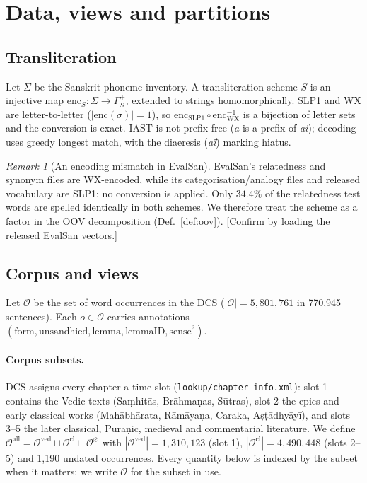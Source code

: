 \documentclass[11pt,a4paper]{article}
\theoremstyle{remark}\newtheorem{remark}{Remark}
\newcommand{\Occ}{\mathcal{O}}          %
\newcommand{\todo}[1]{\textcolor{red!70!black}{[#1]}}
\begin{document}
\section{Data, views and partitions}\label{sec:views}
\subsection{Transliteration}\label{sec:translit}
Let $\Sigma$ be the Sanskrit phoneme inventory. A transliteration scheme $S$ is
an injective map $\mathrm{enc}_S:\Sigma\to\Gamma_S^{+}$, extended to strings
homomorphically. SLP1 and WX are letter-to-letter
($|\mathrm{enc}(\sigma)|=1$), so $\mathrm{enc}_{\text{SLP1}}\circ
\mathrm{enc}_{\text{WX}}^{-1}$ is a bijection of letter sets and the
conversion is exact. IAST is not prefix-free (\emph{a} is a prefix of
\emph{ai}); decoding uses greedy longest match, with the diaeresis (\emph{aï})
marking hiatus.

\begin{remark}[An encoding mismatch in EvalSan]\label{rem:wx}
EvalSan's relatedness and synonym files are WX-encoded, while its
categorisation/analogy files and released vocabulary are SLP1; no
conversion is applied. Only $34.4\%$ of the relatedness test words are spelled
identically in both schemes. We therefore treat the scheme as a factor in the
OOV decomposition (Def.~\ref{def:oov}).
\todo{Confirm by loading the released EvalSan vectors.}
\end{remark}

\subsection{Corpus and views}
Let $\Occ$ be the set of word occurrences in the DCS ($|\Occ| = 5{,}801{,}761$
in 770,945 sentences). Each $o\in\Occ$ carries annotations
$(\text{form}, \text{unsandhied}, \text{lemma}, \text{lemmaID}, \text{sense}^?)$.

\paragraph{Corpus subsets.} DCS assigns every chapter a time slot
(\texttt{lookup/chapter-info.xml}): slot 1 contains the Vedic texts (Saṃhitās,
Brāhmaṇas, Sūtras), slot 2 the epics and early classical works (Mahābhārata,
Rāmāyaṇa, Caraka, Aṣṭādhyāyī), and slots 3--5 the later classical,
Purāṇic, medieval and commentarial literature. We define
$\Occ^{\text{all}} = \Occ^{\text{ved}}\sqcup\Occ^{\text{cl}}\sqcup\Occ^{\varnothing}$
with $|\Occ^{\text{ved}}|=1{,}310{,}123$ (slot 1),
$|\Occ^{\text{cl}}|=4{,}490{,}448$ (slots 2--5) and 1,190 undated occurrences.
Every quantity below is indexed by the subset when it matters; we write
$\Occ$ for the subset in use.
\end{document}
